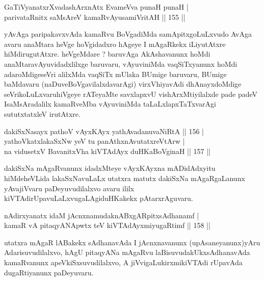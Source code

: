 \begin{shl}
GaTiVyanatxrXvadashArxnAtx EvameVva punaH punaH | \\
parivataRnitx saMsAreV kamaRvAyusamiVritAH \hfill|| 155 || 
\end{shl}

\begin{artha}
yAvAga paripakavxvAda kamaRvu BoVgadiMda samApitxgoLuLxvudo AvAga avaru anaMtara heVge hoVgidadxro hAgeye I mAgaRkekx iLiyutAtxre hiMdirugutAtxre. heVgeMdare ? baruvAga AkAshavanunx hoMdi anaMtaravAyuvidadxlilxge baruvaru, vAyuviniMda vaqSiTxyanunx hoMdi adaroMdigeseVri alilxMda vaqSiTx mUlaka BUmige baruvaru, BUmige baMdavaru (naDuveBoVgavilalxdavarAgi) virxVhiyavAdi dhAnayxdoMdige seVrikoLuLxvaruhiVgeye rATeyaMte savxlapxvU  vishArxMtiyilalxde pade padeV IsaMsAradalilx kamaRveMba vAyuviniMda taLaLxlapxTaTxvarAgi sututxtatxleV irutAtxre.
\end{artha}


\begin{shl}
dakiSxNasayx pathoV vAyxKAyx yathAvadanuvaNiRtA \hfill|| 156 | \\
yathoVkatxlakaSxNw yeV tu panAthxnAvutatxreVtArw | \\
na vidusetxV BavanitxVha kiVTAdAyx duHKaBoVginaH \hfill|| 157 || 
\end{shl}

\begin{artha}
dakiSxNa mAgaRvanunx idadxMteye vAyxKAyxna mADidAdxyitu hiMdeheVLida lakaSxNavuLaLx utatxra matutx dakiSxNa mAgaRgaLanunx yAvajiVvaru paDeyuvudilalxvo avaru ililx kiVTAdirUpavuLaLxvugaLAgiduHKakekx pAtarxrAguvaru.
\end{artha}


\begin{shl}
nA\s \s dirxyanatx idaM jAcnxnamudaknABxgARpitxsAdhanamf | \\
kamaR vA pitaqyANApwtx teV kiVTAdAyxmiyugaRtimf \hfill|| 158 || 
\end{shl}

\begin{artha}
utatxra mAgaR lABakekx sAdhanavAda I jAcnxnavanunx (upAsaneyanunx)yAru Adarisuvudilalxvo, hAgU pitaqyANa mAgaRvu laBisuvudakUkxsAdhanavAda kamaRvanunx apeVkiSxsuvudilalxvo, A jiVvigaLukirxmikiVTAdi rUpavAda dugaRtiyanunx paDeyuvaru.
\end{artha}

